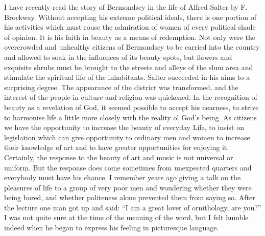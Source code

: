 I have recently read the story of Bermondsey in the
life of Alfred Salter by F. Brockway. Without accepting
his extreme political ideals, there is one portion of his
activities which must rouse the admiration of women of
every political shade of opinion. It is his faith in
beauty as a means of redemption. Not only were the
overcrowded and unhealthy citizens of Bermondsey to be carried
into the country and allowed to soak in the influences of
its beauty spots, but flowers and exquisite shrubs must be
brought to the streets and alleys of the slum area and
stimulate the spiritual life of the inhabitants. Salter
succeeded in his aims to a surprising degree. The
appearance of the district was transformed, and the
interest of the people in culture and religion was
quickened. In the recognition of beauty as a revelation of
God, it seemed possible to accept his nearness, to strive
to harmonise life a little more closely with the reality ol
God's being. As citizens we have the opportunity to
increase the beauty of everyday Life, to insist on legislation
which can give opportunity to ordinary men and women
to increase their knowledge of art and to have greater
opportunities for enjoying it. Certainly, the response to
the beauty of art and music is not universal or uniform.
But the response does come sometimes from unexpected
quarters and everybody must have his chance. I remember
years ago giving a talk on the pleasures of life to a group
of very poor men and wondering whether they were being
bored, and whether politeness alone prevented them from
saying so. After the lecture one man got up and said: ``I
am a great lover of ornithology, are you?'' I was not quite
sure at the time of the meaning of the word, but I felt
humble indeed when he began to express his feeling in
picturesque language.

